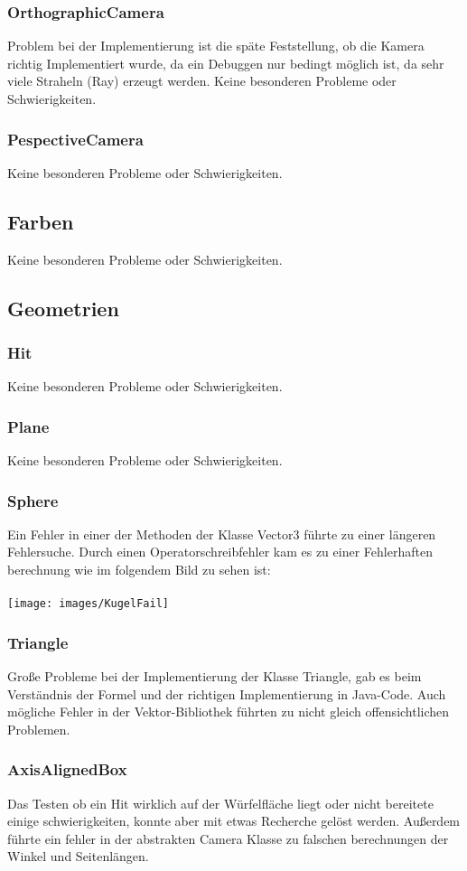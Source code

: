 \documentclass[14pt]{extarticle}
\begin{document}
\subsubsection{OrthographicCamera}
Problem bei der Implementierung ist die späte Feststellung, ob die Kamera richtig Implementiert wurde, da ein Debuggen nur bedingt möglich ist, da sehr viele Straheln (Ray) erzeugt werden.
Keine besonderen Probleme oder Schwierigkeiten.
\subsubsection{PespectiveCamera}
Keine besonderen Probleme oder Schwierigkeiten.
\subsection{Farben}
Keine besonderen Probleme oder Schwierigkeiten.
\subsection{Geometrien}
\subsubsection{Hit}
Keine besonderen Probleme oder Schwierigkeiten.
\subsubsection{Plane}
Keine besonderen Probleme oder Schwierigkeiten.
\subsubsection{Sphere}
Ein Fehler in einer der Methoden der Klasse Vector3 führte zu einer längeren Fehlersuche. Durch einen Operatorschreibfehler kam es zu einer Fehlerhaften berechnung wie im folgendem Bild zu sehen ist:\\\\
\texttt{[image: images/KugelFail]}
\subsubsection{Triangle}
Große Probleme bei der Implementierung der Klasse Triangle, gab es beim Verständnis der Formel und der richtigen Implementierung in Java-Code. Auch mögliche Fehler in der Vektor-Bibliothek führten zu nicht gleich offensichtlichen Problemen. 
\subsubsection{AxisAlignedBox}
Das Testen ob ein Hit wirklich auf der Würfelfläche liegt oder nicht bereitete einige schwierigkeiten, konnte aber mit etwas Recherche gelöst werden. Außerdem führte ein fehler in der abstrakten Camera Klasse zu falschen berechnungen der Winkel und Seitenlängen.
\end{document}
